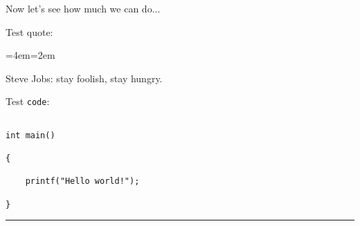 \documentclass[a4paper, 11pt, titlepage, openany]{article}
\newenvironment{blockquote}{%
  \par%
  \medskip
  \leftskip=4em\rightskip=2em%
  \noindent\ignorespaces}{%
  \par\medskip}
\begin{document}
Now let's see how much we can do...

Test quote:

\begin{blockquote}

Steve Jobs: stay foolish, stay hungry.
\end{blockquote}

Test \texttt{code}:

\begin{verbatim}

int main()

{

    printf("Hello world!");

}
\end{verbatim}


\noindent\rule{\textwidth}{0.4pt}
\end{document}
